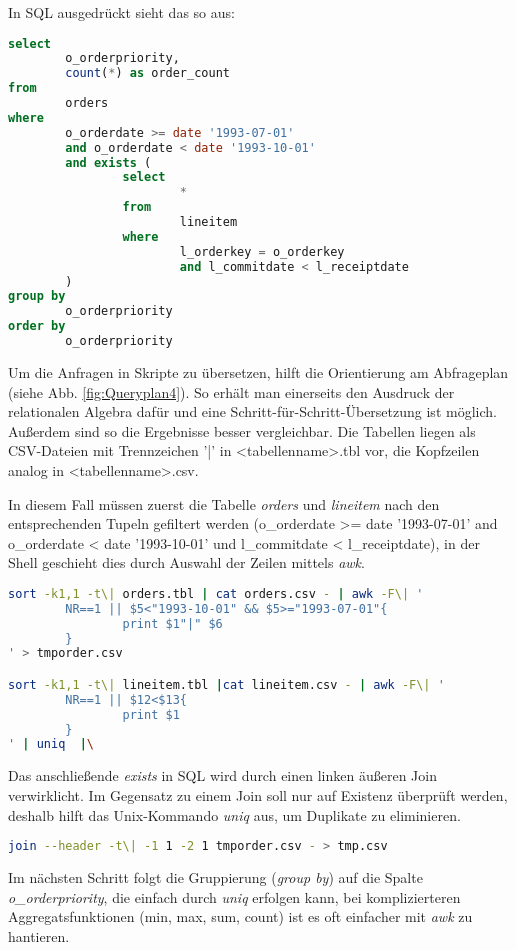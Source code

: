 In SQL ausgedrückt sieht das so aus:

\begin{lstlisting}[language=SQL]
select
        o_orderpriority,
        count(*) as order_count
from
        orders
where
        o_orderdate >= date '1993-07-01'
        and o_orderdate < date '1993-10-01'
        and exists (
                select
                        *
                from
                        lineitem
                where
                        l_orderkey = o_orderkey
                        and l_commitdate < l_receiptdate
        )
group by
        o_orderpriority
order by
        o_orderpriority
\end{lstlisting}

Um die Anfragen in Skripte zu übersetzen, hilft die Orientierung am Abfrageplan (siehe Abb. \ref{fig:Queryplan4}). So erhält man einerseits den Ausdruck der relationalen Algebra dafür und eine Schritt-für-Schritt-Übersetzung ist möglich. Außerdem sind so die Ergebnisse besser vergleichbar. Die Tabellen liegen als CSV-Dateien mit Trennzeichen '|' in <tabellenname>.tbl vor, die Kopfzeilen analog in <tabellenname>.csv.

In diesem Fall müssen zuerst die Tabelle \textit{orders} und \textit{lineitem} nach den entsprechenden Tupeln gefiltert werden (o\_orderdate >= date '1993-07-01' and o\_orderdate < date '1993-10-01' und l\_commitdate < l\_receiptdate), in der Shell geschieht dies durch Auswahl der Zeilen mittels \textit{awk}.

\begin{lstlisting}[language=Bash]
sort -k1,1 -t\| orders.tbl | cat orders.csv - | awk -F\| '
        NR==1 || $5<"1993-10-01" && $5>="1993-07-01"{
                print $1"|" $6
        }
' > tmporder.csv

sort -k1,1 -t\| lineitem.tbl |cat lineitem.csv - | awk -F\| '
        NR==1 || $12<$13{
                print $1
        }
' | uniq  |\
\end{lstlisting}

Das anschließende \textit{exists} in SQL wird durch einen linken äußeren Join verwirklicht. Im Gegensatz zu einem Join soll nur auf Existenz überprüft werden, deshalb hilft das Unix-Kommando \textit{uniq} aus, um Duplikate zu eliminieren. 

\begin{lstlisting}[language=Bash]
join --header -t\| -1 1 -2 1 tmporder.csv - > tmp.csv
\end{lstlisting}

Im nächsten Schritt folgt die Gruppierung (\textit{group by}) auf die Spalte \textit{o\_orderpriority}, die einfach durch \textit{uniq} erfolgen kann, bei komplizierteren Aggregatsfunktionen (min, max, sum, count) ist es oft einfacher mit \textit{awk} zu hantieren.

